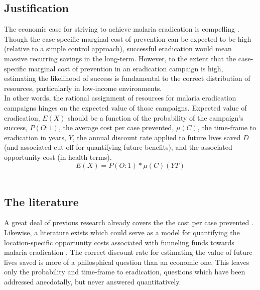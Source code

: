 \documentclass{article}
\begin{document}
\subsection*{Justification}


\noindent The economic case for striving to achieve malaria eradication is compelling \cite{Barofsky2015}. Though the case-specific marginal cost of prevention can be expected to be high (relative to a simple control approach), successful eradication would mean massive recurring savings in the long-term. However, to the extent that the case-specific marginal cost of prevention in an eradication campaign is high, estimating the likelihood of success is fundamental to the correct distribution of resources, particularly in low-income environments. \\

\noindent In other words, the rational assignment of resources for malaria eradication campaigns hinges on the expected value of those campaigns. Expected value of eradication, $ E(X) $ should be a function of the probability of the campaign's success, $ P(O:1) $, the average cost per case prevented, $ \mu(C) $, the time-frame to eradication in years, $ Y $, the annual discount rate applied to future lives saved $ D $ (and associated cut-off for quantifying future benefits), and the associated opportunity cost (in health terms). \\


\[ E(X) = P(O:1) * \mu(C)(YT) \] \\


\subsection*{The literature}


\noindent A great deal of previous research already covers the the cost per case prevented \cite{Sicuri2011, Silumbe2015, Btto2016, IlungaIlunga2014, Dalaba2015}. Likewise, a literature exists which could serve as a model for quantifying the location-specific opportunity costs associated with funneling funds towards malaria eradication \cite{Stuckey2014, White2011, Korenromp2012}. The correct discount rate for estimating the value of future lives saved is more of a philosphical question than an economic one. This leaves only the probability and time-frame to eradication, questions which have been addressed anecdotally, but never answered quantitatively. \\
\end{document}
